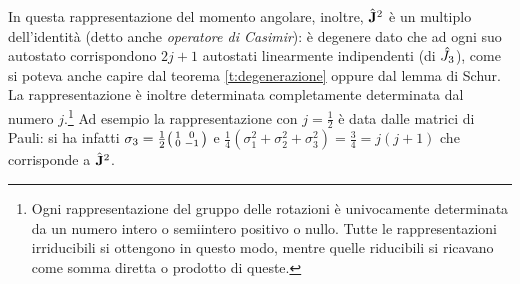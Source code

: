 In questa rappresentazione del momento angolare, inoltre, $\hat{\mathbf{J}}^2$ è un multiplo dell'identità (detto anche \emph{operatore di Casimir}): è degenere dato che ad ogni suo autostato corrispondono $2j+1$ autostati linearmente indipendenti (di $\hat{J}_3$), come si poteva anche capire dal teorema \ref{t:degenerazione} oppure dal lemma di Schur.
La rappresentazione è inoltre determinata completamente determinata dal numero $j$.\footnote{Ogni rappresentazione del gruppo delle rotazioni è univocamente determinata da un numero intero o semiintero positivo o nullo. Tutte le rappresentazioni irriducibili si ottengono in questo modo, mentre quelle riducibili si ricavano come somma diretta o prodotto di queste.}
Ad esempio la rappresentazione con $j=\frac12$ è data dalle matrici di Pauli: si ha infatti $\sigma_3=\frac12\begin{psmallmatrix}1&0\\0&-1\end{psmallmatrix}$ e $\frac14(\sigma_1^2+\sigma_2^2+\sigma_3^2)=\frac34=j(j+1)$ che corrisponde a $\hat{\mathbf{J}}^2$.

